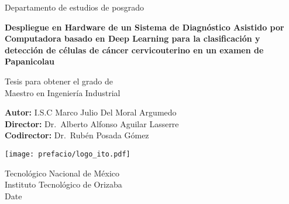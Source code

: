\begin{titlepage}
    \begin{center}
        \large
        Departamento de estudios de posgrado
        \vspace*{1cm}
        
        \large
        \textbf{Despliegue en Hardware de un Sistema de Diagnóstico Asistido por Computadora basado en Deep Learning para la clasificación y detección de células de cáncer cervicouterino en un examen de Papanicolau}

        \vspace*{1cm}
        Tesis para obtener el grado de \\
        Maestro en Ingeniería Industrial
        
        \vspace*{1cm}
        \textbf{Autor:} I.S.C Marco Julio Del Moral Argumedo \\
        \textbf{Director:} Dr.\ Alberto Alfonso Aguilar Lasserre \\
        \textbf{Codirector:} Dr.\ Rubén Posada Gómez
        \vspace*{1cm}
        
        \texttt{[image: prefacio/logo\_ito.pdf]}
        
        \Large
        
        Tecnológico Nacional de México\\
        Instituto Tecnológico de Orizaba\\
        Date
        
    \end{center}
\end{titlepage}